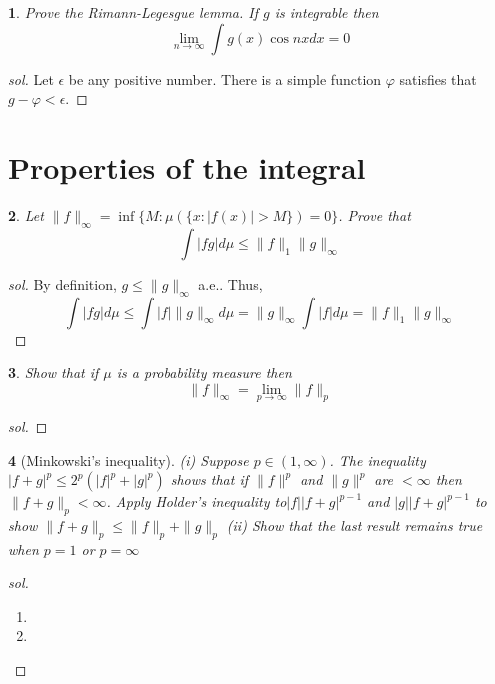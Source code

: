 \documentclass{report}
\newtheorem{ex}{}[section]
\begin{document}
\begin{ex}
Prove the Rimann-Legesgue lemma. If $g$ is integrable then
\[\lim_{n\to\infty} \int g(x) \cos nx dx  = 0\]
\end{ex}
\begin{proof}[sol]
Let $\epsilon$ be any positive number. There is a simple function $\varphi$ satisfies that $g - \varphi < \epsilon$. 
\end{proof}
\section{Properties of the integral}
\begin{ex}
Let $\|f\|_\infty = \inf\{M : \mu(\{x : |f(x)| > M\}) = 0\}$. Prove that
\[\int |fg| d\mu \le \|f\|_1\|g\|_\infty\]
\end{ex}
\begin{proof}[sol]
By definition, $g \le \|g\|_\infty$ a.e.. Thus,
\[\int |fg| d\mu \le \int |f|\|g\|_\infty d\mu = \|g\|_\infty \int|f|d\mu = \|f\|_1\|g\|_\infty\]

\end{proof}
\begin{ex}
Show that if $\mu$ is a probability measure then
\[\|f\|_\infty = \lim_{p\to\infty} \|f\|_p\]
\end{ex}
\begin{proof}[sol]
\end{proof}
\begin{ex}[Minkowski's inequality]
(i) Suppose $p \in (1,\infty)$. The inequality $|f+g|^p \le 2^p(|f|^p + |g|^p)$ shows that if $\|f\|^p$ and $\|g\|^p$ are $<\infty$ then $\|f+g\|_p < \infty$. Apply Holder's inequality to$|f||f+g|^{p-1}$ and $|g||f+g|^{p-1}$ to show $\|f+g\|_p \le \|f\|_p + \|g\|_p$ (ii) Show that the last result remains true when $p = 1$ or $p = \infty$
\end{ex}
\begin{proof}[sol]~
\begin{enumerate}
    \item[(i)] 
    \item[(ii)] 
\end{enumerate}
\end{proof}
\end{document}
